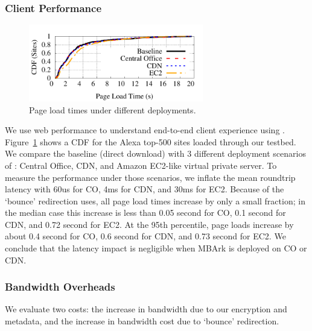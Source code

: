 \subsubsection{Client Performance}

\begin{figure}
  \hspace{-15pt}
  \centering
  \includegraphics[width=3in]{fig/e2e_compare}
  \caption[]{\label{fig:e2eloads} Page load times under different deployments.}
\end{figure}

We use web performance to understand end-to-end client experience using \sys.
Figure~\ref{fig:e2eloads} shows a CDF for the Alexa top-500 sites loaded through our testbed. We compare the baseline (direct download) with 3 different deployment scenarios of \sys: Central Office, CDN, and Amazon EC2-like virtual private server. To measure the performance under those scenarios, we inflate the mean roundtrip latency with 60us for CO, 4ms for CDN, and 30ms for EC2. 
Because of the `bounce' redirection \sys uses, all page load times increase by only a small fraction; in the median case this increase is less than 0.05 second for CO, 0.1 second for CDN, and 0.72 second for EC2. At the 95th percentile, page loads increase by about 0.4 second for CO, 0.6 second for CDN, and 0.73 second for EC2. We conclude that the latency impact is negligible when MBArk is deployed on CO or CDN.

\subsubsection{Bandwidth Overheads}
We evaluate two costs: the increase in bandwidth due to our encryption and metadata, and the increase in bandwidth cost due to `bounce' redirection.

